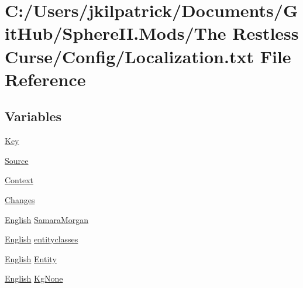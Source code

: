 \hypertarget{_the_01_restless_01_curse_2_config_2_localization_8txt}{}\section{C\+:/\+Users/jkilpatrick/\+Documents/\+Git\+Hub/\+Sphere\+II.Mods/\+The Restless Curse/\+Config/\+Localization.txt File Reference}
\label{_the_01_restless_01_curse_2_config_2_localization_8txt}
\subsection*{Variables}
\begin{DoxyCompactItemize}
\item 
\mbox{\hyperlink{_the_01_restless_01_curse_2_config_2_localization_8txt_ab3c7af4820830f9166ede9e5623c4e73}{Key}}
\item 
\mbox{\hyperlink{_the_01_restless_01_curse_2_config_2_localization_8txt_a176e1eca2d1e3d1c6a064340bc6a351e}{Source}}
\item 
\mbox{\hyperlink{_the_01_restless_01_curse_2_config_2_localization_8txt_abbebfae2c8b3c06e3115e79965277840}{Context}}
\item 
\mbox{\hyperlink{_the_01_restless_01_curse_2_config_2_localization_8txt_aada75e543d2eadaa69533d17cac8bd9a}{Changes}}
\item 
\mbox{\hyperlink{_sphere_i_i_01_winter_01_project_2_config_2_localization_8txt_ad896b63205779b1b09e86d941ce13976}{English}} \mbox{\hyperlink{_the_01_restless_01_curse_2_config_2_localization_8txt_aaab0dede1e0f13cd5d9b134f9bdf86c5}{Samara\+Morgan}}
\item 
\mbox{\hyperlink{_sphere_i_i_01_winter_01_project_2_config_2_localization_8txt_ad896b63205779b1b09e86d941ce13976}{English}} \mbox{\hyperlink{_the_01_restless_01_curse_2_config_2_localization_8txt_ab48b06ed080b302a01ca5ecb66d21827}{entityclasses}}
\item 
\mbox{\hyperlink{_sphere_i_i_01_winter_01_project_2_config_2_localization_8txt_ad896b63205779b1b09e86d941ce13976}{English}} \mbox{\hyperlink{_the_01_restless_01_curse_2_config_2_localization_8txt_a831452d5736d8c492ddd792b09c12cde}{Entity}}
\item 
\mbox{\hyperlink{_sphere_i_i_01_winter_01_project_2_config_2_localization_8txt_ad896b63205779b1b09e86d941ce13976}{English}} \mbox{\hyperlink{_the_01_restless_01_curse_2_config_2_localization_8txt_acc1c43e0980c5828bcfaf85313744919}{Kg\+None}}

\end{DoxyCompactItemize}

